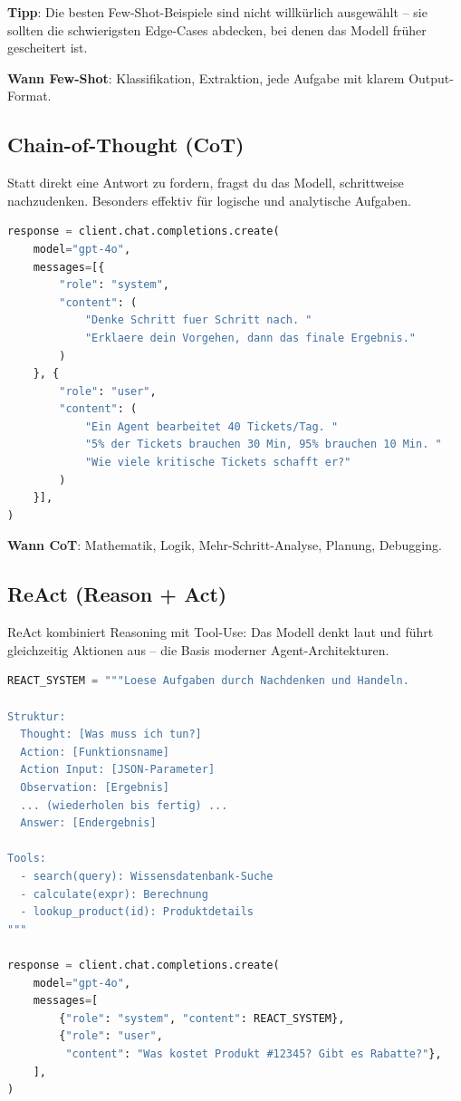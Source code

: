 \textbf{Tipp}: Die besten Few-Shot-Beispiele sind nicht willkürlich ausgewählt -- sie sollten die schwierigsten Edge-Cases abdecken, bei denen das Modell früher gescheitert ist.

\textbf{Wann Few-Shot}: Klassifikation, Extraktion, jede Aufgabe mit klarem Output-Format.

\subsection{Chain-of-Thought (CoT)}

Statt direkt eine Antwort zu fordern, fragst du das Modell, schrittweise nachzudenken. Besonders effektiv für logische und analytische Aufgaben.

\begin{lstlisting}[language=Python, caption=Chain-of-Thought]
response = client.chat.completions.create(
    model="gpt-4o",
    messages=[{
        "role": "system",
        "content": (
            "Denke Schritt fuer Schritt nach. "
            "Erklaere dein Vorgehen, dann das finale Ergebnis."
        )
    }, {
        "role": "user",
        "content": (
            "Ein Agent bearbeitet 40 Tickets/Tag. "
            "5% der Tickets brauchen 30 Min, 95% brauchen 10 Min. "
            "Wie viele kritische Tickets schafft er?"
        )
    }],
)
\end{lstlisting}

\textbf{Wann CoT}: Mathematik, Logik, Mehr-Schritt-Analyse, Planung, Debugging.

\subsection{ReAct (Reason + Act)}

ReAct kombiniert Reasoning mit Tool-Use: Das Modell denkt laut und führt gleichzeitig Aktionen aus -- die Basis moderner Agent-Architekturen.

\begin{lstlisting}[language=Python, caption=ReAct-Prompting]
REACT_SYSTEM = """Loese Aufgaben durch Nachdenken und Handeln.

Struktur:
  Thought: [Was muss ich tun?]
  Action: [Funktionsname]
  Action Input: [JSON-Parameter]
  Observation: [Ergebnis]
  ... (wiederholen bis fertig) ...
  Answer: [Endergebnis]

Tools:
  - search(query): Wissensdatenbank-Suche
  - calculate(expr): Berechnung
  - lookup_product(id): Produktdetails
"""

response = client.chat.completions.create(
    model="gpt-4o",
    messages=[
        {"role": "system", "content": REACT_SYSTEM},
        {"role": "user",
         "content": "Was kostet Produkt #12345? Gibt es Rabatte?"},
    ],
)
\end{lstlisting}

